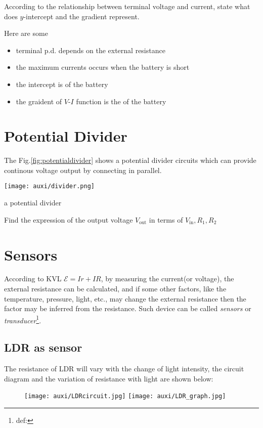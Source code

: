 \documentclass[a4paper]{tufte-handout}
\newenvironment{TaskBox} %
{\begin{tcolorbox}[breakable,colback=b1!30,colframe=b1,title=Task]} {\end{tcolorbox}}
\newenvironment{SummBox}
{\begin{tcolorbox}[breakable,colback=r1!30,colframe=r1,title=Summary]} {\end{tcolorbox}}
\begin{document}
\begin{TaskBox}
According to the relationship between terminal voltage and current, state what does $y$-intercept and the gradient represent.
\vspace{0.5in}
\end{TaskBox}

Here are some 
\begin{SummBox}
\begin{itemize}
  \item terminal p.d. depends on the external resistance
  \item the maximum currents occurs when the battery is short
  \item the intercept is \uline{\hspace{0.8 in}} of the battery
  \item the graident of $V$-$I$ function is the \uline{\hspace{1 in}} of the battery
\end{itemize}
\end{SummBox}

\section{Potential Divider}
The Fig.\ref{fig:potentialdivider} shows a potential divider circuits which can provide continous voltage output by connecting in parallel. 
\begin{marginfigure}
\texttt{[image: auxi/divider.png]}
\caption{a potential divider}
\label{fig:potentialdivider}
\end{marginfigure}
\begin{TaskBox}
Find the expression of the output voltage $V_{\text{out}}$ in terms of $V_{\text{in}}, R_1, R_2$
\vspace{0.3 in}
\end{TaskBox}

\section{Sensors}
According to KVL $\mathcal{E}=Ir+IR$, by measuring the current(or voltage), the external resistance can be calculated, and if some other factors, like the temperature, pressure, light, etc., may change the external resistance then the factor may be inferred from the resistance. Such device can be called \emph{sensors} or \emph{transducer}\footnote{def:}.

\subsection{LDR as sensor}
The resistance of LDR will vary with the change of light intensity, the circuit diagram and the variation of resistance with light are shown below:
\begin{figure}[h]
\texttt{[image: auxi/LDRcircuit.jpg]}
\texttt{[image: auxi/LDR\_graph.jpg]}
\end{figure}
\end{document}
